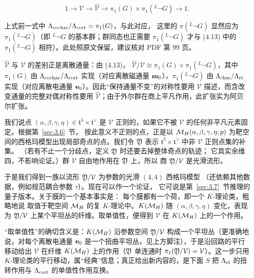 \setcounter{equation}{12}
\begin{equation}\label{eq:4.13}
  1\to {\mathcal V}\to \hat{\mathcal V}\to \pi_1( G)\times
\pi_1({}^L\neg G)\to 1.
\end{equation}

\begin{yizhu}[原文疑误]上式前一式中 $\Lambda_{\rm cochar}/\Lambda_{\rm cort}=\pi_1(G)$，与此对应，
这里的 $\pi({}^L\neg G)$ 显然应为 $\pi_1({}^L\neg G)$（即 $^L\neg G$ 的基本群；群同态也正需要
$\pi_1({}^L\neg G)$ 才与 (4.13) 中的 $\pi_1({}^L\neg G)$ 相符）。此处照原文保留，建议核对 PDF 第 99 页。\end{yizhu}

\begin{yizhu}[易错点]$\hat{\mathcal V}$ 与 $\mathcal V$ 的差别正是离散通量：由 (4.13)，
$\hat{\mathcal V}/\mathcal V\cong\pi_1(G)\times\pi_1({}^L\neg G)$，其中 $\pi_1(G)$ 由 $\Lambda_{\rm cochar}/\Lambda_{\rm cort}$
实现（对应离散磁通量 ${\bf m}_0$），$\pi_1({}^L\neg G)$ 由 $\Lambda_{\rm char}/\Lambda_{\rm rt}$ 实现（对应离散电通量
${\bf e}_0$）。因此“保持通量不变”的对称性要用 $\mathcal V$ 描述，而含改变通量的完整对偶对称性要用
$\hat{\mathcal V}$；由于外尔群在商上平凡作用，此扩张实为阿贝尔扩张。\end{yizhu}

我们说点 $(\alpha,\beta,\gamma,\eta)\in \mathfrak
t^3\times \mathfrak t^\vee$ 是 ${\mathcal V}$ 正则的，如果它不被
$\mathcal V$ 的任何非平凡元素固定。根据第~\ref{sec:3.6}~节，
按此意义不正则的点，正是以
${{\mathcal{M}}_H}(\alpha,\beta,\gamma,\eta;p)$ 为靶空间的西格玛模型出现局部奇点的点。我们令
${\mathfrak{Y}}$ 表示 $\mathfrak t^3\times\mathfrak t^\vee$ 中非 ${\mathcal V}$ 正则点集的补集。
（若有不止一个分歧点，定义 ${\mathfrak{Y}}$ 时还要去掉整体奇点的轨迹；
它具实余维四，不影响论证。）群 ${\mathcal V}$ 自由地作用在 ${\mathfrak{Y}}$ 上，所以
商 ${\mathfrak{Y}}/{\mathcal V}$ 是光滑流形。

于是我们得到一族以流形 ${\mathfrak{Y}}/{\mathcal V}$ 为参数的光滑 $(4,4)$ 西格玛模型
（还依赖其他数据，例如规范耦合参数 $\tau$）。现在可以作一个论证，
它可说是第~\ref{sec:3.7}~节推理的量子版本。关于膜的一个基本事实是：
每个膜都有一个荷，即一个 $K$-理论类，粗略地说
取值于靶空间 ${{\mathcal{M}}_H}$ 的复 $K$-理论中。$K({{\mathcal{M}}_H})$ 随
$(\alpha,\beta,\gamma,\eta)$ 变化，表现为
${\mathfrak{Y}}/{\mathcal V}$ 上某个平坦丛的纤维。取单值性，便得到 $\mathcal V$
在 $K({{\mathcal{M}}_H})$ 上的一个作用。

\begin{yizhu}[含糊点拨]“取单值性”的确切含义是：$K({{\mathcal{M}}_H})$ 沿参数空间 ${\mathfrak{Y}}/\mathcal V$ 构成一个平坦丛（更准确地说，对每个离散电通量 ${\bf e}_0$ 是一个扭曲平坦丛，见上方脚注），于是沿回路的平行移动给出 $\mathcal V$ 在纤维 $K({{\mathcal{M}}_H})$ 上的作用（${\mathfrak{Y}}$ 单连通时 $\pi_1({\mathfrak{Y}}/\mathcal V)=\mathcal V$）。这一步只用 $K$-理论类的平行移动，属“经典”信息；真正给出新内容的，是下面 $S$ 把 $\Lambda_{\rm rt}$ 的扭转作用与 $\Lambda_{\rm cort}$ 的单值性作用互换。\end{yizhu}

